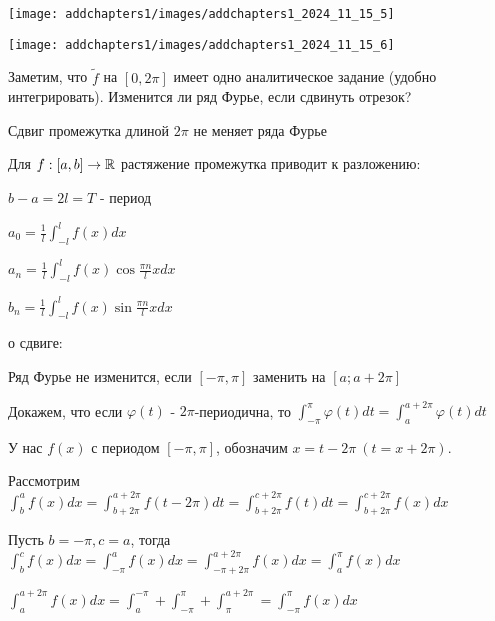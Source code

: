 \documentclass[12pt]{article}
\begin{document}
    \mediumvspace

    \begin{multicols}{2}
        \texttt{[image: addchapters1/images/addchapters1\_2024\_11\_15\_5]}

        \texttt{[image: addchapters1/images/addchapters1\_2024\_11\_15\_6]}
    \end{multicols}

    \mediumvspace

    Заметим, что $\tilde{f}$ на $[0, 2\pi]$ имеет одно аналитическое задание (удобно интегрировать). Изменится ли 
    ряд Фурье, если сдвинуть отрезок?

    \hypertarget{shifttheorem}{}
    
    \begin{MyTheorem}
         Сдвиг промежутка длиной $2\pi$ не меняет ряда Фурье
    \end{MyTheorem}

    \hypertarget{stretchingtheorem}{}

    \begin{MyTheorem}
         Для $f : [a, b] \to \mathbb{R}$ растяжение промежутка приводит к разложению:

        $b - a = 2l = T$ - период

        $a_0 = \frac{1}{l} \int_{-l}^l f(x) dx$

        $a_n = \frac{1}{l} \int_{-l}^l f(x) \cos \frac{\pi n}{l} x dx$

        $b_n = \frac{1}{l} \int_{-l}^l f(x) \sin \frac{\pi n}{l} x dx$
    \end{MyTheorem}






\begin{MyTheorem}
     о сдвиге:

    Ряд Фурье не изменится, если $[-\pi, \pi]$ заменить на $[a; a + 2\pi]$
\end{MyTheorem}

\begin{MyProof}
    Докажем, что если $\varphi(t)$ - $2\pi$-периодична, то $\int_{-\pi}^\pi \varphi(t) dt = \int_a^{a + 2\pi} \varphi(t) dt$

    У нас $f(x)$ с периодом $[-\pi, \pi]$, обозначим $x = t - 2\pi \ (t = x + 2\pi)$.

    Рассмотрим $\int_b^a f(x)dx = \int_{b + 2\pi}^{a + 2\pi} f(t - 2\pi) dt = \int_{b + 2\pi}^{c + 2\pi} f(t)dt = \int_{b + 2\pi}^{c + 2\pi} f(x)dx$

    Пусть $b = -\pi, c = a$, тогда $\int_b^c f(x)dx = \int_{-\pi}^a f(x)dx = \int_{-\pi + 2\pi}^{a + 2\pi} f(x)dx = \int_a^{\pi} f(x)dx$

    $\int_a^{a + 2\pi} f(x)dx = \int_a^{-\pi} + \int_{-\pi}^\pi + \int_\pi^{a + 2\pi} = \int_{-\pi}^{\pi} f(x)dx$

\end{MyProof}
\end{document}
